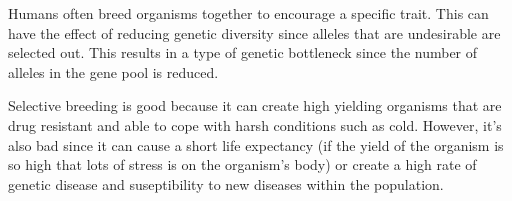 \documentclass{article}
\begin{document}
Humans often breed organisms together to encourage a specific trait. This can
have the effect of reducing genetic diversity since alleles that are undesirable
are selected out. This results in a type of genetic bottleneck since the number
of alleles in the gene pool is reduced.

Selective breeding is good because it can create high yielding organisms that
are drug resistant and able to cope with harsh conditions such as cold. However,
it's also bad since it can cause a short life expectancy (if the yield of the
organism is so high that lots of stress is on the organism's body) or create a
high rate of genetic disease and suseptibility to new diseases within the
population.
\end{document}
